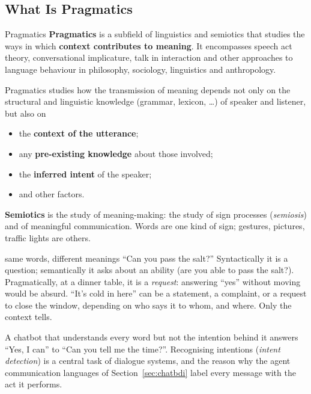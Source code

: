 \subsection{What Is Pragmatics}
\label{sec:what-is-pragmatics}

\begin{nbdef}{Pragmatics}
\textbf{Pragmatics} is a subfield of linguistics and semiotics that studies the ways in
which \textbf{context contributes to meaning}. It encompasses speech act theory,
conversational implicature, talk in interaction and other approaches to language
behaviour in philosophy, sociology, linguistics and anthropology.

Pragmatics studies how the transmission of meaning depends not only on the structural
and linguistic knowledge (grammar, lexicon, \ldots) of speaker and listener, but also on
\begin{itemize}[nosep]
  \item the \textbf{context of the utterance};
  \item any \textbf{pre-existing knowledge} about those involved;
  \item the \textbf{inferred intent} of the speaker;
  \item and other factors.
\end{itemize}
\end{nbdef}

\textbf{Semiotics} is the study of meaning-making: the study of sign processes
(\emph{semiosis}) and of meaningful communication. Words are one kind of sign; gestures,
pictures, traffic lights are others.

\begin{nbexample}{same words, different meanings}
``Can you pass the salt?'' Syntactically it is a question; semantically it asks about an
ability (are you able to pass the salt?). Pragmatically, at a dinner table, it is a
\emph{request}: answering ``yes'' without moving would be absurd. ``It's cold in
here'' can be a statement, a complaint, or a request to close the window, depending on
who says it to whom, and where. Only the context tells.
\end{nbexample}

\begin{nbwhy}
A chatbot that understands every word but not the intention behind it answers ``Yes, I
can'' to ``Can you tell me the time?''. Recognising intentions (\emph{intent detection})
is a central task of dialogue systems, and the reason why the agent communication
languages of Section~\ref{sec:chatbdi} label every message with the act it performs.
\end{nbwhy}

